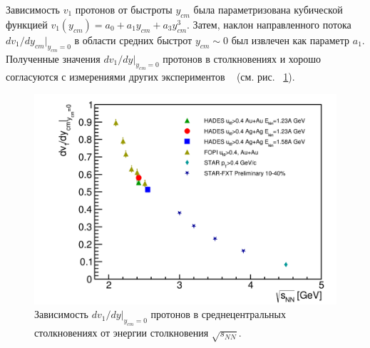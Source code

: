 Зависимость  $v_1$ протонов от  быстроты $y_{cm}$ была параметризована кубической функцией $v_1(y_{cm}) = a_0 + a_1 y_{cm} + a_3 y_{cm}^3$. 
Затем, наклон направленного потока  $dv_1/dy_{cm}|_{y_{cm}=0}$ в области средних быстрот $y_{cm}\sim0$ был извлечен как параметр $a_1$.
Полученные значения $dv_1/dy|_{y_{cm}=0}$ протонов в столкновениях \au{}  и \ag{} хорошо
согласуются с измерениями  других экспериментов ~\cite{FOPI:2011aa,STAR:2020dav} (см. рис. ~\ref{fig:hades_dv1_dy_sqrt_snn}).
%
\begin{figure}[h]
\begin{center}
\includegraphics[width=0.6\linewidth]{images/dv1_dy_sqrt_snn.png}
\caption{ 
  Зависимость  $dv_1/dy|_{y_{cm}=0}$ протонов в среднецентральных столкновениях от  энергии столкновения $\sqrt{s_{NN}}$.
}
\label{fig:hades_dv1_dy_sqrt_snn}
\end{center}
\end{figure}


